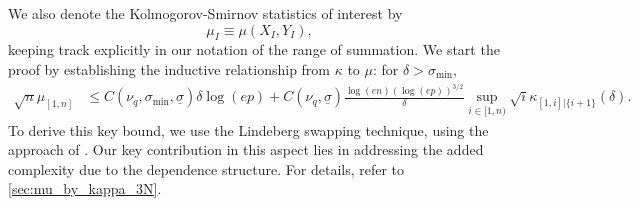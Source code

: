 \documentclass[aos]{imsart}
\begin{document}
We also denote the Kolmogorov-Smirnov statistics of interest by
\begin{equation*}
    \mu_{I} \equiv \mu({X}_{I}, {Y}_{I}),
\end{equation*}
keeping track explicitly in our notation of the range of summation.
We start the proof by establishing the inductive relationship from $\kappa$ to $\mu$: for $\delta > \sigma_{\min}$,
\begin{equation} \label{eq:mu_by_kappa}
\begin{aligned}
    \sqrt{n} \mu_{[1,n]}
    & \leq C(\nu_q, \sigma_{\min}, \underline{\sigma}) \delta \log(ep) 
    + C(\nu_q, \underline{\sigma}) \frac{ \log(en) (\log(ep))^{3/2}}{\delta} \sup_{i \in [1,n)} \sqrt{i} \kappa_{[1,i]|\{i+1\}}\left(\delta\right).
\end{aligned}
\end{equation}
To derive this key bound, we use the Lindeberg swapping technique, using the approach of . Our key contribution in this aspect lies in addressing the added complexity due to the dependence structure. For details,  refer to \cref{sec:mu_by_kappa_3N}.
\end{document}
